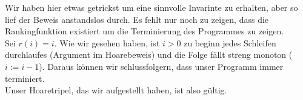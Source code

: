 \documentclass[11pt,a4paper,ngerman]{article}
\begin{document}
Wir haben hier etwas getrickst um eine sinnvolle Invarinte zu erhalten, aber so lief der Beweis anstandslos durch. Es fehlt nur noch zu zeigen, dass die Rankingfunktion existiert um die Terminierung des Programmes zu zeigen.\\
Sei $r(i) = i$. Wie wir gesehen haben, ist $i>0$ zu beginn jedes Schleifen durchlaufes (Argument im Hoarebeweis) und die Folge fällt streng monoton ($i := i-1$). Daraus können wir schlussfolgern, dass unser Programm immer terminiert.\\

Unser Hoaretripel, das wir aufgestellt haben, ist also gültig.

\label{LastPage}
\end{document}
